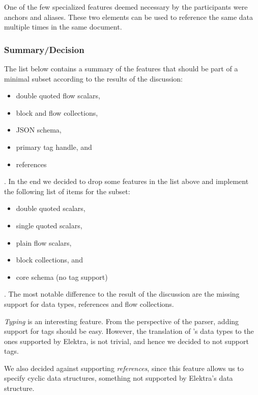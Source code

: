 One of the few specialized features deemed necessary by the participants were anchors and aliases. These two elements can be used to reference the same data multiple times in the same document.

\subsubsection{Summary/Decision}
\label{sec:discussion_summary_decision}

The list below contains a summary of the  features that should be part of a minimal  subset according to the results of the discussion:

\begin{itemize}
  \item double quoted flow scalars,
  \item block and flow collections,
  \item JSON schema,
  \item primary tag handle, and
  \item references
\end{itemize}

. In the end we decided to drop some features in the list above and implement the following list of items for the  subset:

\begin{itemize}
  \item double quoted scalars,
  \item single quoted scalars,
  \item plain flow scalars,
  \item block collections, and
  \item core schema (no tag support)
\end{itemize}

. The most notable difference to the result of the discussion are the missing support for data types, references and flow collections.

\emph{Typing} is an interesting feature. From the perspective of the parser, adding support for tags should be easy. However, the translation of ’s data types to the ones supported by Elektra, is not trivial, and hence we decided to not support tags.

We also decided against supporting \emph{references}, since this feature allows us to specify cyclic data structures, something not supported by Elektra’s  data structure.

